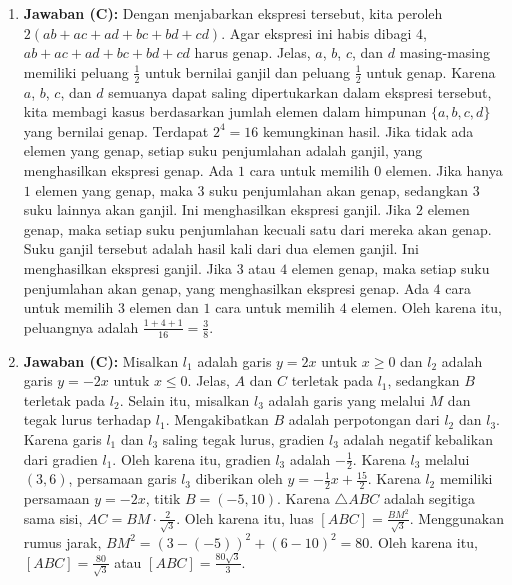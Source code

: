 \documentclass[12pt]{scrartcl}
\begin{document}
\begin{enumerate}
\item \textbf{Jawaban (C):} Dengan menjabarkan ekspresi tersebut, kita peroleh $2(ab+ac+ad+bc+bd+cd)$. Agar ekspresi ini habis dibagi $4$, $ab+ac+ad+bc+bd+cd$ harus genap. Jelas, $a$, $b$, $c$, dan $d$ masing-masing memiliki peluang $\frac{1}{2}$ untuk bernilai ganjil dan peluang $\frac{1}{2}$ untuk genap. Karena $a$, $b$, $c$, dan $d$ semuanya dapat saling dipertukarkan dalam ekspresi tersebut, kita membagi kasus berdasarkan jumlah elemen dalam himpunan $\{a, b, c, d\}$ yang bernilai genap. Terdapat $2^{4}=16$ kemungkinan hasil. Jika tidak ada elemen yang genap, setiap suku penjumlahan adalah ganjil, yang menghasilkan ekspresi genap. Ada $1$ cara untuk memilih $0$ elemen. Jika hanya $1$ elemen yang genap, maka $3$ suku penjumlahan akan genap, sedangkan $3$ suku lainnya akan ganjil. Ini menghasilkan ekspresi ganjil. Jika $2$ elemen genap, maka setiap suku penjumlahan kecuali satu dari mereka akan genap. Suku ganjil tersebut adalah hasil kali dari dua elemen ganjil. Ini menghasilkan ekspresi ganjil. Jika $3$ atau $4$ elemen genap, maka setiap suku penjumlahan akan genap, yang menghasilkan ekspresi genap. Ada $4$ cara untuk memilih $3$ elemen dan $1$ cara untuk memilih $4$ elemen. Oleh karena itu, peluangnya adalah $\frac{1+4+1}{16}=\frac{3}{8}$.

\item \textbf{Jawaban (C):} Misalkan $l_{1}$ adalah garis $y=2x$ untuk $x\ge0$ dan $l_{2}$ adalah garis $y=-2x$ untuk $x\le0$. Jelas, $A$ dan $C$ terletak pada $l_{1}$, sedangkan $B$ terletak pada $l_{2}$. Selain itu, misalkan $l_{3}$ adalah garis yang melalui $M$ dan tegak lurus terhadap $l_{1}$. Mengakibatkan $B$ adalah perpotongan dari $l_{2}$ dan $l_{3}$. Karena garis $l_{1}$ dan $l_{3}$ saling tegak lurus, gradien $l_{3}$ adalah negatif kebalikan dari gradien $l_{1}$. Oleh karena itu, gradien $l_{3}$ adalah $-\frac{1}{2}$. Karena $l_{3}$ melalui $(3,6)$, persamaan garis $l_{3}$ diberikan oleh $y=-\frac{1}{2}x+\frac{15}{2}$. Karena $l_{2}$ memiliki persamaan $y=-2x$, titik $B=(-5,10)$. Karena $\triangle ABC$ adalah segitiga sama sisi, $AC=BM\cdot\frac{2}{\sqrt{3}}$. Oleh karena itu, luas $[ABC]=\frac{BM^{2}}{\sqrt{3}}$. Menggunakan rumus jarak, $BM^{2}=(3-(-5))^{2}+(6-10)^{2}=80$. Oleh karena itu, $[ABC]=\frac{80}{\sqrt{3}}$ atau $[ABC]=\frac{80\sqrt{3}}{3}$.


\end{enumerate}
\end{document}
